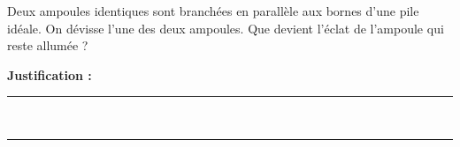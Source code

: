 Deux ampoules identiques sont branchées en parallèle aux bornes d'une pile idéale. On dévisse l'une des deux ampoules. Que devient l'éclat de l'ampoule qui reste allumée ?

\choices

\noindent\textbf{Justification :} \hrulefill \\[2.5ex]
\rule{\linewidth}{0.4pt} \\[2.5ex]
\rule{\linewidth}{0.4pt}
\vfill
